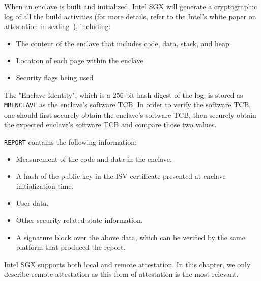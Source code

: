  When an enclave is built and initialized, Intel SGX will generate a cryptographic log of all the build activities (for more details, refer to the Intel's white paper on attestation in sealing~\cite{attestation_primitive_all}), including:

\begin{itemize}
  \item The content of the enclave that includes code, data, stack, and heap
  \item Location of each page within the enclave
  \item Security flags being used
\end{itemize}
    
The "Enclave Identity", which is a 256-bit hash digest of the log, is stored as \texttt{MRENCLAVE} as the enclave's software TCB. In order to verify the software TCB, one should first securely obtain the enclave's software TCB, then securely obtain the expected enclave's software TCB and compare those two values.

 \texttt{REPORT} contains the following information:

\begin{itemize}
  \item Measurement of the code and data in the enclave.
  \item A hash of the public key in the ISV certificate presented at enclave initialization time.
  \item User data.
  \item Other security-related state information.
  \item A signature block over the above data, which can be verified by the same platform that produced the report.
\end{itemize}

Intel SGX supports both local and remote attestation. In this chapter, we only describe remote attestation as this form of attestation is the most relevant.

